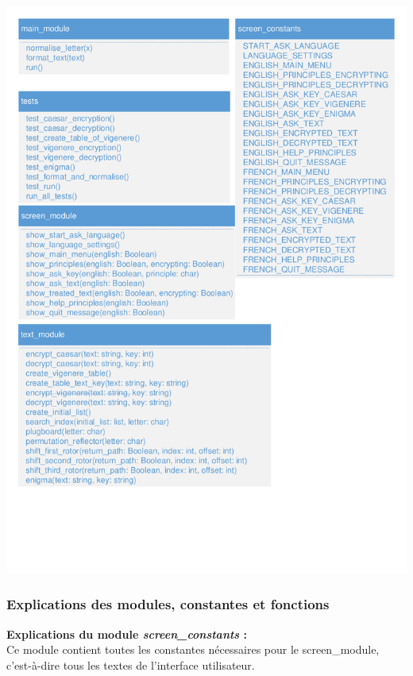 \documentclass[a4paper,12pt,abstracton,titlepage]{scrartcl}
\begin{document}
\begin{minipage}[c]{\textwidth}
\centering
    \includegraphics[width=\textwidth, trim=1mm 40mm 1mm 1mm, clip]{./Diagrammes/diagrammeDeStructure_main_modules.pdf}
    \label{img:structure}
\end{minipage}


\newpage
\subsubsection{Explications des modules, constantes et fonctions}
\vspace{0.3cm}
\textbf{Explications du module \textit{screen\_constants} :}\\
Ce module contient toutes les constantes nécessaires pour le screen\_module, c'est-à-dire tous les textes de l'interface utilisateur.
\vspace{0.3cm}
\end{document}
